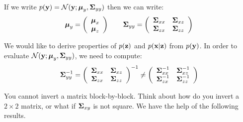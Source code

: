 If we write $p(\boldsymbol{\mathbf{y}}) = {\mathcal N}(\boldsymbol{\mathbf{y}};\boldsymbol{\mathbf{\mu}}_y,\boldsymbol{\mathbf{\Sigma}}_{yy})$ then we can write:
\begin{equation}
  \boldsymbol{\mathbf{\mu}}_{y}=\left(\begin{array}{c}\boldsymbol{\mathbf{\mu}}_x\\\boldsymbol{\mathbf{\mu}}_z\end{array}\right) \qquad
  \boldsymbol{\mathbf{\Sigma}}_{yy}= \left(\begin{array}{cc} \boldsymbol{\mathbf{\Sigma}}_{xx} & \boldsymbol{\mathbf{\Sigma}}_{xz} \\ \boldsymbol{\mathbf{\Sigma}}_{zx} & \boldsymbol{\mathbf{\Sigma}}_{zz} \end{array}\right)
\end{equation}

We would like to derive properties of $p(\boldsymbol{\mathbf{z}})$ and $p(\boldsymbol{\mathbf{x}}|\boldsymbol{\mathbf{z}})$ from $p(\boldsymbol{\mathbf{y}})$. In order to evaluate ${\mathcal N}(\boldsymbol{\mathbf{y}};\boldsymbol{\mathbf{\mu}}_y,\boldsymbol{\mathbf{\Sigma}}_{yy})$, we need to compute:
\begin{equation}
  \boldsymbol{\mathbf{\Sigma}}_{yy}^{-1} = \left(\begin{array}{cc} \boldsymbol{\mathbf{\Sigma}}_{xx} & \boldsymbol{\mathbf{\Sigma}}_{xz} \\ \boldsymbol{\mathbf{\Sigma}}_{zx} & \boldsymbol{\mathbf{\Sigma}}_{zz} \end{array}\right)^{-1} \neq \left(\begin{array}{cc} \boldsymbol{\mathbf{\Sigma}}_{xx}^{-1} & \boldsymbol{\mathbf{\Sigma}}_{xz}^{-1} \\ \boldsymbol{\mathbf{\Sigma}}_{zx}^{-1} & \boldsymbol{\mathbf{\Sigma}}_{zz}^{-1} \end{array}\right)
\end{equation} 

You cannot invert a matrix block-by-block. Think about how do you invert a $2\times 2$ matrix, or what if $\boldsymbol{\mathbf{\Sigma}}_{xy}$ is not square. We have the help of the following results.\vspace{3mm}




